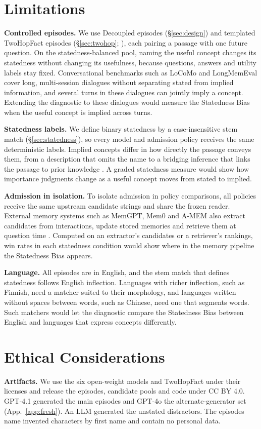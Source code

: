 \section*{Limitations}

\textbf{Controlled episodes.} We use Decoupled episodes (\S\ref{sec:design}) and templated TwoHopFact episodes (\S\ref{sec:twohop}; \citealp{yang2024latent}), each pairing a passage with one future question. On the statedness-balanced pool, naming the useful concept changes its statedness without changing its usefulness, because questions, answers and utility labels stay fixed. Conversational benchmarks such as LoCoMo and LongMemEval \citep{maharana2024locomo,wu2025longmemeval} cover long, multi-session dialogues without separating stated from implied information, and several turns in these dialogues can jointly imply a concept. Extending the diagnostic to these dialogues would measure the Statedness Bias when the useful concept is implied across turns.

\textbf{Statedness labels.} We define binary statedness by a case-insensitive stem match (\S\ref{sec:statedness}), so every model and admission policy receives the same deterministic labels. Implied concepts differ in how directly the passage conveys them, from a description that omits the name to a bridging inference that links the passage to prior knowledge \citep{haviland1974whatsnew}. A graded statedness measure would show how importance judgments change as a useful concept moves from stated to implied.

\textbf{Admission in isolation.} To isolate admission in policy comparisons, all policies receive the same upstream candidate strings and share the frozen reader. External memory systems such as MemGPT, Mem0 and A-MEM also extract candidates from interactions, update stored memories and retrieve them at question time \citep{packer2023memgpt,mem0,amem2025}. Computed on an extractor's candidates or a retriever's rankings, win rates in each statedness condition would show where in the memory pipeline the Statedness Bias appears.

\textbf{Language.} All episodes are in English, and the stem match that defines statedness follows English inflection. Languages with richer inflection, such as Finnish, need a matcher suited to their morphology, and languages written without spaces between words, such as Chinese, need one that segments words. Such matchers would let the diagnostic compare the Statedness Bias between English and languages that express concepts differently.

\section*{Ethical Considerations}

\textbf{Artifacts.} We use the six open-weight models and TwoHopFact under their licenses and release the episodes, candidate pools and code under CC BY 4.0. GPT-4.1 generated the main episodes and GPT-4o the alternate-generator set (App.~\ref{app:fresh}). An LLM generated the unstated distractors. The episodes name invented characters by first name and contain no personal data.

